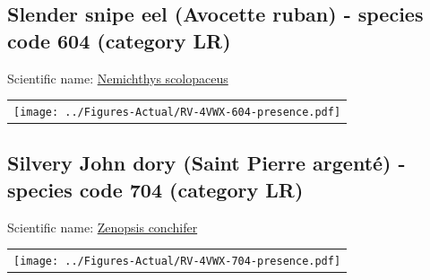 \documentclass[12pt]{article}\usepackage[]{graphicx}\usepackage[]{color}
\begin{document}
\setcounter{figure}{0}

\hypertarget{sec:604}{%
\subsection{Slender snipe eel (Avocette ruban) - species code 604 (category LR)}\label{sec:604}}

  


Scientific name: \href{http://www.marinespecies.org/aphia.php?p=taxdetails\&id=126306}{Nemichthys scolopaceus} \newline
\begin{minipage}{1.0\textwidth}
 \begin{tabular}{c}
\texttt{[image: ../Figures-Actual/RV-4VWX-604-presence.pdf]} \\ 
\end{tabular} 
\end{minipage}
\clearpage

\renewcommand\thefigure{\thesubsection\Alph{figure}}

\setcounter{figure}{0}

\hypertarget{sec:704}{%
\subsection{Silvery John dory (Saint Pierre argenté) - species code 704 (category LR)}\label{sec:704}}

  


Scientific name: \href{http://www.marinespecies.org/aphia.php?p=taxdetails\&id=127426}{Zenopsis conchifer} \newline
\begin{minipage}{1.0\textwidth}
 \begin{tabular}{c}
\texttt{[image: ../Figures-Actual/RV-4VWX-704-presence.pdf]} \\ 
\end{tabular} 
\end{minipage}
\clearpage

\renewcommand\thefigure{\thesubsection\Alph{figure}}
\end{document}
